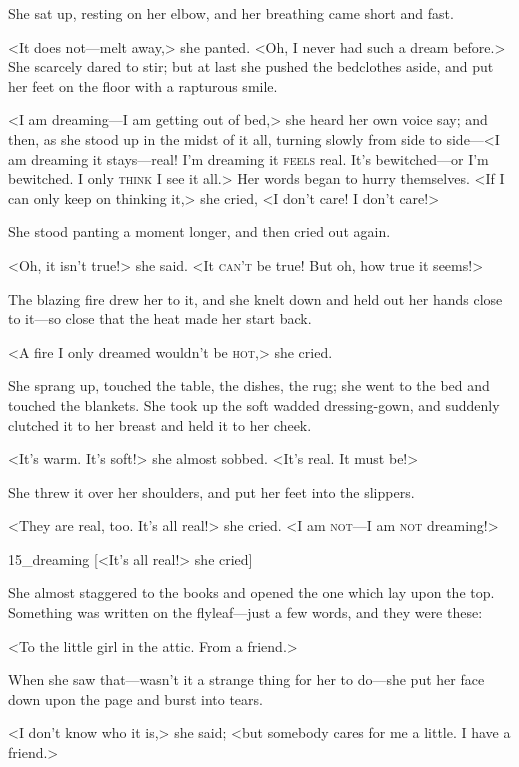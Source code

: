 She sat up, resting on her elbow, and her breathing came short and fast.

<It does not—melt away,> she panted. <Oh, I never had such a dream before.> She scarcely dared to stir; but at last she pushed the bedclothes aside, and put her feet on the floor with a rapturous smile.

<I am dreaming—I am getting out of bed,> she heard her own voice say; and then, as she stood up in the midst of it all, turning slowly from side to side—<I am dreaming it stays—real! I'm dreaming it \textsc{feels} real. It's bewitched—or I'm bewitched. I only \textsc{think} I see it all.> Her words began to hurry themselves. <If I can only keep on thinking it,> she cried, <I don't care! I don't care!>

She stood panting a moment longer, and then cried out again.

<Oh, it isn't true!> she said. <It \textsc{can't} be true! But oh, how true it seems!>

The blazing fire drew her to it, and she knelt down and held out her hands close to it—so close that the heat made her start back.

<A fire I only dreamed wouldn't be \textsc{hot},> she cried.

She sprang up, touched the table, the dishes, the rug; she went to the bed and touched the blankets. She took up the soft wadded dressing-gown, and suddenly clutched it to her breast and held it to her cheek.

<It's warm. It's soft!> she almost sobbed. <It's real. It must be!>

She threw it over her shoulders, and put her feet into the slippers.

<They are real, too. It's all real!> she cried. <I am \textsc{not}—I am \textsc{not} dreaming!>

\begin{colorbigpic}
	[\basicscale]
	{15_dreaming}
	[<It's all real!> she cried]
\end{colorbigpic}

She almost staggered to the books and opened the one which lay upon the top. Something was written on the flyleaf—just a few words, and they were these:

<To the little girl in the attic. From a friend.>

When she saw that—wasn't it a strange thing for her to do—she put her face down upon the page and burst into tears.

<I don't know who it is,> she said; <but somebody cares for me a little. I have a friend.>

